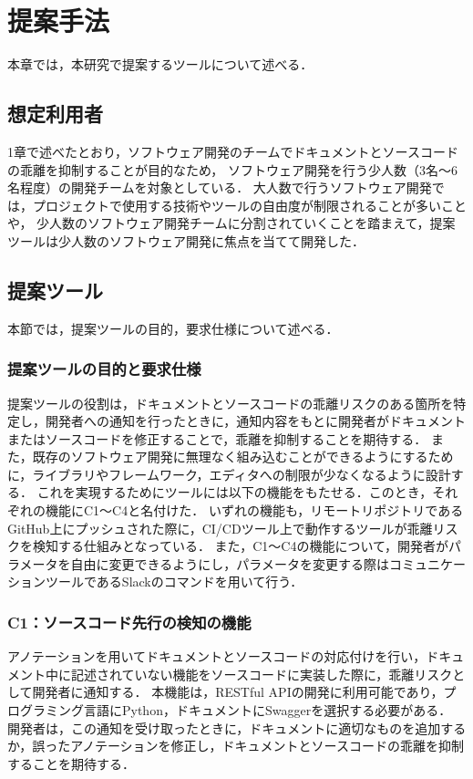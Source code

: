 \chapter{提案手法}
本章では，本研究で提案するツールについて述べる．

\section{想定利用者}
1章で述べたとおり，ソフトウェア開発のチームでドキュメントとソースコードの乖離を抑制することが目的なため，
ソフトウェア開発を行う少人数（3名〜6名程度）の開発チームを対象としている．
大人数で行うソフトウェア開発では，プロジェクトで使用する技術やツールの自由度が制限されることが多いことや，
少人数のソフトウェア開発チームに分割されていくことを踏まえて，提案ツールは少人数のソフトウェア開発に焦点を当てて開発した．

\section{提案ツール}
\label{tool}
本節では，提案ツールの目的，要求仕様について述べる．

\subsection{提案ツールの目的と要求仕様}
\label{required}
提案ツールの役割は，ドキュメントとソースコードの乖離リスクのある箇所を特定し，開発者への通知を行ったときに，通知内容をもとに開発者がドキュメントまたはソースコードを修正することで，乖離を抑制することを期待する．
また，既存のソフトウェア開発に無理なく組み込むことができるようにするために，ライブラリやフレームワーク，エディタへの制限が少なくなるように設計する．
これを実現するためにツールには以下の機能をもたせる．このとき，それぞれの機能にC1〜C4と名付けた．
いずれの機能も，リモートリポジトリであるGitHub上にプッシュされた際に，CI/CDツール上で動作するツールが乖離リスクを検知する仕組みとなっている．
また，C1〜C4の機能について，開発者がパラメータを自由に変更できるようにし，パラメータを変更する際はコミュニケーションツールであるSlackのコマンドを用いて行う．

\subsection{C1：ソースコード先行の検知の機能}
\label{c1}
アノテーションを用いてドキュメントとソースコードの対応付けを行い，ドキュメント中に記述されていない機能をソースコードに実装した際に，乖離リスクとして開発者に通知する．
本機能は，RESTful APIの開発に利用可能であり，プログラミング言語にPython，ドキュメントにSwaggerを選択する必要がある．
開発者は，この通知を受け取ったときに，ドキュメントに適切なものを追加するか，誤ったアノテーションを修正し，ドキュメントとソースコードの乖離を抑制することを期待する．

